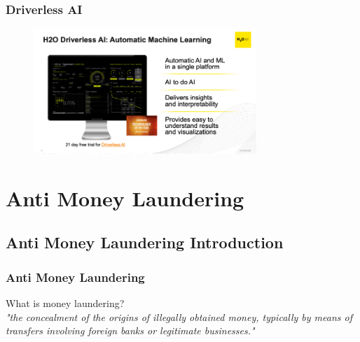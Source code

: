 \documentclass[11pt,
               aspectratio=169,
               hyperref={colorlinks}
               ]{beamer}
\begin{document}
	\begin{frame}
		\frametitle{Driverless AI}
		\begin{figure}[htb]
			\begin{center}
				\includegraphics[width=0.75\textwidth]{img/dai.png}
				\label{fig:dai}
			\end{center}
		\end{figure}
	\end{frame}
\section{Anti Money Laundering}
	\subsection{Anti Money Laundering Introduction}
	\begin{frame}
		\frametitle{Anti Money Laundering}
		What is money laundering?\\
		\textit{"the concealment of the origins of illegally obtained money, typically by means of transfers involving foreign banks or legitimate businesses."}
	\end{frame}

\end{document}
